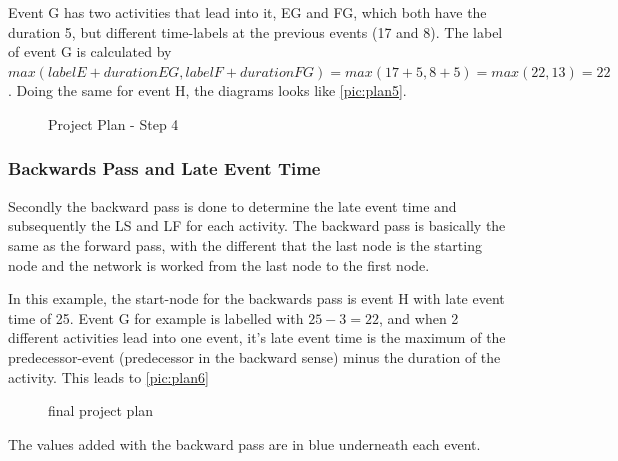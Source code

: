 Event G has two activities that lead into it, EG and FG, which both have the duration 5, but different time-labels at the previous events (17 and 8). The label of event G is calculated by $ max(label E + duration EG, label F + duration FG) = max(17+5, 8+5) = max(22,13) = 22 $. Doing the same for event H, the diagrams looks like \autoref{pic:plan5}.
\begin{figure}[h] 
\centerline{}
\caption{Project Plan - Step 4}
\label{pic:plan5}
\end{figure}
\subsubsection{Backwards Pass and Late Event Time}
 Secondly the backward pass is done to determine the late event time and subsequently the LS and LF for each activity.
 The backward pass is basically the same as the forward pass, with the different that the last node is the starting node and the network is worked from the last node to the first node.

In this example, the start-node for the backwards pass is event H with late event time of 25. Event G for example is labelled with $ 25-3 = 22 $, and when 2 different activities lead into one event, it's late event time is the maximum of the predecessor-event (predecessor in the backward sense) minus the duration of the activity. This leads to \autoref{pic:plan6}
\begin{figure}[h] 
\centerline{}
\caption{final project plan}
\label{pic:plan6}
\end{figure}
The values added with the backward pass are in blue underneath each event.


